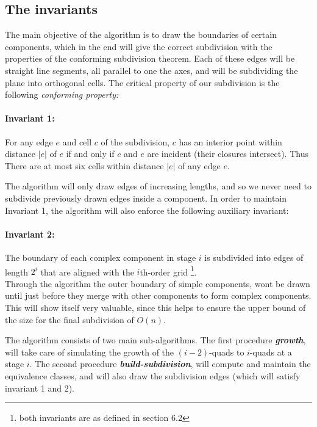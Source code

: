 \subsection{The invariants}

The main objective of the algorithm is to draw the boundaries of certain components, which in 
the end will give the correct subdivision with the properties of the conforming subdivision theorem. 
Each of these edges will be straight line segments,
all parallel to one the axes, and will be subdividing the plane into orthogonal cells. The 
critical property of our subdivision is the following \textit{conforming property:}

\paragraph{Invariant 1:} For any edge $e$ and cell $c$ of the subdivision, $c$ has an interior 
point within distance $|e|$ of $e$ if and only if $c$ and $e$ are incident (their closures 
intersect). Thus There are at most six cells within distance $|e|$ of any edge $e$. \\ 

The algorithm will only draw edges of increasing lengths, and so we never need to subdivide 
previously drawn edges inside a component. In order to maintain Invariant 1, the algorithm 
will also enforce the following auxiliary invariant:

\paragraph{Invariant 2:} The boundary of each complex component in stage $i$ is subdivided 
into edges of length $2^i$ that are aligned with the $i$th-order grid \footnote{both invariants 
are as defined in \cite{HershbergerS99} section 6.2}. \\

Through the algorithm the outer boundary of simple components, wont be drawn until just before 
they merge with other components to form complex components. This will show itself very valuable,
since this helps to ensure the upper bound of the size for the final subdivision of $O(n)$.

The algorithm consists of two main sub-algorithms. The first procedure \textit{\textbf{growth}}, 
will take care of simulating the growth of the $(i-2)$-quads to $i$-quads at a stage $i$. The 
second procedure \textit{\textbf{build-subdivision}}, will compute and maintain the equivalence 
classes, and will also draw the subdivision edges (which will satisfy invariant 1 and 2). 

